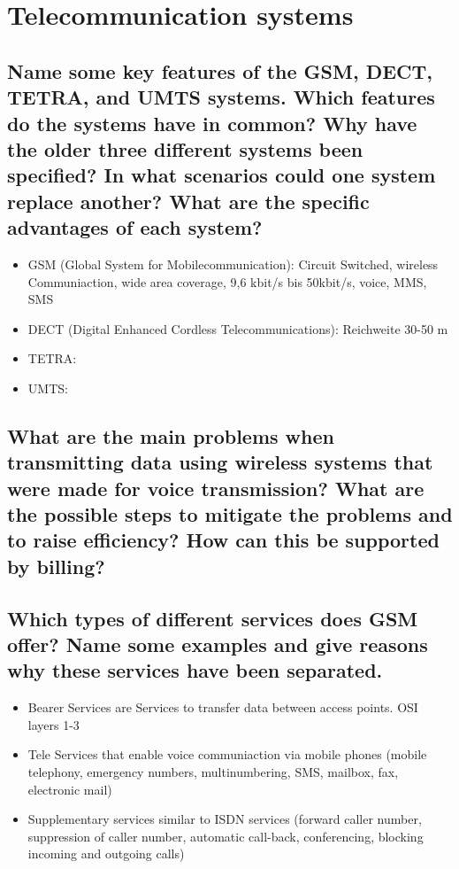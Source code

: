 \section{Telecommunication systems}

\subsection{Name some key features of the GSM, DECT, TETRA, and UMTS systems. Which
features do the systems have in common? Why have the older three different
systems been specified? In what scenarios could one system replace another? What
are the specific advantages of each system?}
\begin{itemize}

\item GSM (Global System for Mobilecommunication): Circuit Switched, wireless Communiaction, wide area coverage, 9,6 kbit/s bis 50kbit/s, voice, MMS, SMS

\item DECT (Digital Enhanced Cordless Telecommunications): Reichweite 30-50 m

\item TETRA: 

\item UMTS:

\end{itemize}

\subsection{What are the main problems when transmitting data using wireless systems that were
made for voice transmission? What are the possible steps to mitigate the problems
and to raise efficiency? How can this be supported by billing?}

\subsection{Which types of different services does GSM offer? Name some examples and give
reasons why these services have been separated.}
\begin{itemize}
\item Bearer Services are Services to transfer data between access points. OSI layers 1-3

\item Tele Services that enable voice communiaction via mobile phones (mobile telephony, emergency numbers, multinumbering, SMS, mailbox, fax, electronic mail)

\item Supplementary services similar to ISDN services (forward caller number, suppression of caller number, automatic call-back, conferencing, blocking incoming and outgoing calls)
\end{itemize}


